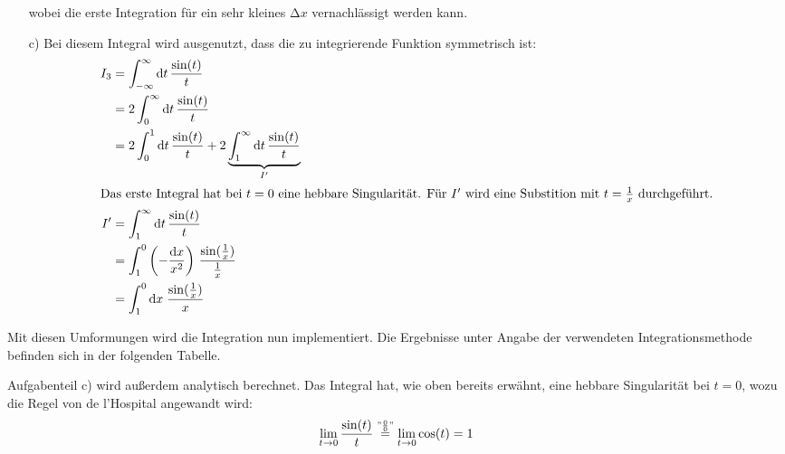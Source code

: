 \begin{itemize}[leftmargin=*]
          wobei die erste Integration für ein sehr kleines $\increment x$ vernachlässigt werden kann.
\item[c)] Bei diesem Integral wird ausgenutzt, dass die zu integrierende Funktion symmetrisch ist:
          \begin{align*}
          I_3 &= \int_{-\infty}^{\infty} \text{d} t \, \frac{\sin (t)}{t} \\
              &= 2 \int_{0}^{\infty} \text{d} t \, \frac{\sin (t)}{t} \\
              &= 2 \int_{0}^{1} \text{d} t \, \frac{\sin (t)}{t} + 2 \underbrace{\int_{1}^{\infty} \text{d} t \, \frac{\sin (t)}{t}}_{I'} \\
          \intertext{Das erste Integral hat bei $t=0$ eine hebbare Singularität. Für $I'$ wird eine Substition mit $t = \frac{1}{x}$ durchgeführt.}
          I' &= \int_{1}^{\infty} \text{d} t \, \frac{\sin (t)}{t} \\
             &= \int_{1}^{0}  \left(- \frac{\text{d} x}{x^2}\right) \, \frac{\sin (\frac{1}{x})}{\frac{1}{x}} \\
             &= \int_{1}^{0} \text{d} x \; \frac{\sin (\frac{1}{x})}{x}
          \end{align*}
\end{itemize}
Mit diesen Umformungen wird die Integration nun implementiert. Die Ergebnisse unter Angabe der verwendeten Integrationsmethode
befinden sich in der folgenden Tabelle.
\FloatBarrier
\begin{table}[h]
    \centering
		\label{tab:tab1}
		\caption{Ergebnisse der Berechnung der einzelen Integrale.}
\end{table}
\FloatBarrier
\noindent
Aufgabenteil c) wird außerdem analytisch berechnet. Das Integral hat, wie oben bereits erwähnt, eine hebbare Singularität
bei $t = 0$, wozu die Regel von de l'Hospital angewandt wird:
\begin{equation*}
  \lim_{t \to 0} \frac{\sin (t)}{t} \stackrel{"\frac{0}{0}"}{=} \lim_{t \to 0} \cos (t) = 1
\end{equation*}
